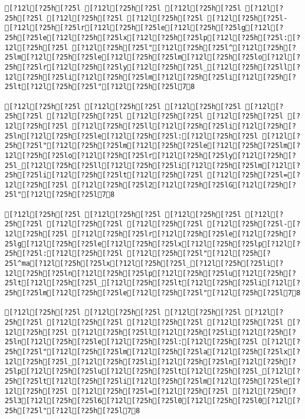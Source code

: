 \documentclass{scrartcl}
\begin{document}
\begin{Verbatim}
[?12l[?25h[?25l [?12l[?25h[?25l [?12l[?25h[?25l [?12l[?25h[?25l [?12l[?25h[?25l [?12l[?25h[?25l [?12l[?25h[?25l- [?12l[?25h[?25lr[?12l[?25h[?25le[?12l[?25h[?25lg[?12l[?25h[?25le[?12l[?25h[?25lx[?12l[?25h[?25lp[?12l[?25h[?25l:[?12l[?25h[?25l [?12l[?25h[?25l"[?12l[?25h[?25l^[?12l[?25h[?25lm[?12l[?25h[?25le[?12l[?25h[?25lm[?12l[?25h[?25lo[?12l[?25h[?25lr[?12l[?25h[?25ly[?12l[?25h[?25l_[?12l[?25h[?25ll[?12l[?25h[?25li[?12l[?25h[?25lm[?12l[?25h[?25li[?12l[?25h[?25lt[?12l[?25h[?25l"[?12l[?25h[?25l78

[?12l[?25h[?25l [?12l[?25h[?25l [?12l[?25h[?25l [?12l[?25h[?25l [?12l[?25h[?25l [?12l[?25h[?25l [?12l[?25h[?25l [?12l[?25h[?25l [?12l[?25h[?25ll[?12l[?25h[?25li[?12l[?25h[?25ln[?12l[?25h[?25le[?12l[?25h[?25l:[?12l[?25h[?25l [?12l[?25h[?25l"[?12l[?25h[?25lm[?12l[?25h[?25le[?12l[?25h[?25lm[?12l[?25h[?25lo[?12l[?25h[?25lr[?12l[?25h[?25ly[?12l[?25h[?25l_[?12l[?25h[?25ll[?12l[?25h[?25li[?12l[?25h[?25lm[?12l[?25h[?25li[?12l[?25h[?25lt[?12l[?25h[?25l [?12l[?25h[?25l=[?12l[?25h[?25l [?12l[?25h[?25l2[?12l[?25h[?25lG[?12l[?25h[?25l"[?12l[?25h[?25l78

[?12l[?25h[?25l [?12l[?25h[?25l [?12l[?25h[?25l [?12l[?25h[?25l [?12l[?25h[?25l [?12l[?25h[?25l [?12l[?25h[?25l-[?12l[?25h[?25l [?12l[?25h[?25lr[?12l[?25h[?25le[?12l[?25h[?25lg[?12l[?25h[?25le[?12l[?25h[?25lx[?12l[?25h[?25lp[?12l[?25h[?25l:[?12l[?25h[?25l [?12l[?25h[?25l"[?12l[?25h[?25l^ma[?12l[?25h[?25lx[?12l[?25h[?25l_[?12l[?25h[?25li[?12l[?25h[?25ln[?12l[?25h[?25lp[?12l[?25h[?25lu[?12l[?25h[?25lt[?12l[?25h[?25l_[?12l[?25h[?25lt[?12l[?25h[?25li[?12l[?25h[?25lm[?12l[?25h[?25le[?12l[?25h[?25l"[?12l[?25h[?25l78

[?12l[?25h[?25l [?12l[?25h[?25l [?12l[?25h[?25l [?12l[?25h[?25l [?12l[?25h[?25l [?12l[?25h[?25l [?12l[?25h[?25l [?12l[?25h[?25l [?12l[?25h[?25ll[?12l[?25h[?25li[?12l[?25h[?25ln[?12l[?25h[?25le[?12l[?25h[?25l:[?12l[?25h[?25l [?12l[?25h[?25l"[?12l[?25h[?25lm[?12l[?25h[?25la[?12l[?25h[?25lx[?12l[?25h[?25l_[?12l[?25h[?25li[?12l[?25h[?25ln[?12l[?25h[?25lp[?12l[?25h[?25lu[?12l[?25h[?25lt[?12l[?25h[?25l_[?12l[?25h[?25lt[?12l[?25h[?25li[?12l[?25h[?25lm[?12l[?25h[?25le[?12l[?25h[?25l [?12l[?25h[?25l=[?12l[?25h[?25l [?12l[?25h[?25l3[?12l[?25h[?25l6[?12l[?25h[?25l0[?12l[?25h[?25l0[?12l[?25h[?25l"[?12l[?25h[?25l78


\end{Verbatim}
\end{document}
